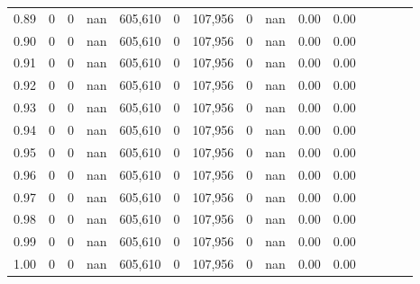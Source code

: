 \begin{tabular}{rrrcrrrrrrrrrrr}
0.89 &        0 &       0 &                                        nan &  605,610 &        0 &  107,956 &        0 &   nan &  0.00 &                         0.00 \\
0.90 &        0 &       0 &                                        nan &  605,610 &        0 &  107,956 &        0 &   nan &  0.00 &                         0.00 \\
0.91 &        0 &       0 &                                        nan &  605,610 &        0 &  107,956 &        0 &   nan &  0.00 &                         0.00 \\
0.92 &        0 &       0 &                                        nan &  605,610 &        0 &  107,956 &        0 &   nan &  0.00 &                         0.00 \\
0.93 &        0 &       0 &                                        nan &  605,610 &        0 &  107,956 &        0 &   nan &  0.00 &                         0.00 \\
0.94 &        0 &       0 &                                        nan &  605,610 &        0 &  107,956 &        0 &   nan &  0.00 &                         0.00 \\
0.95 &        0 &       0 &                                        nan &  605,610 &        0 &  107,956 &        0 &   nan &  0.00 &                         0.00 \\
0.96 &        0 &       0 &                                        nan &  605,610 &        0 &  107,956 &        0 &   nan &  0.00 &                         0.00 \\
0.97 &        0 &       0 &                                        nan &  605,610 &        0 &  107,956 &        0 &   nan &  0.00 &                         0.00 \\
0.98 &        0 &       0 &                                        nan &  605,610 &        0 &  107,956 &        0 &   nan &  0.00 &                         0.00 \\
0.99 &        0 &       0 &                                        nan &  605,610 &        0 &  107,956 &        0 &   nan &  0.00 &                         0.00 \\
1.00 &        0 &       0 &                                        nan &  605,610 &        0 &  107,956 &        0 &   nan &  0.00 &                         0.00 \\
\bottomrule
\end{tabular}
